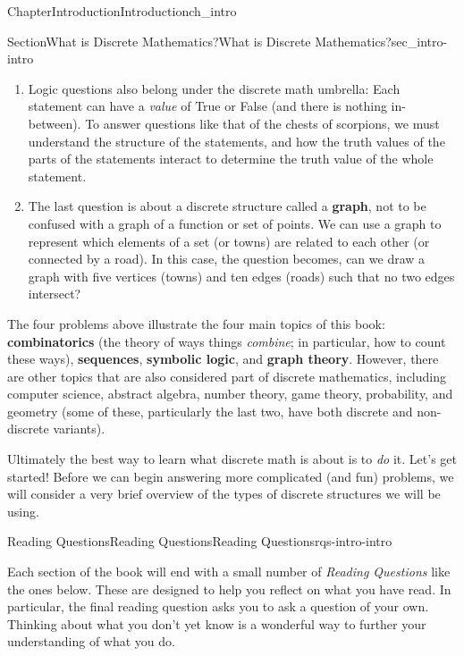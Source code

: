 \documentclass[twoside,11pt,]{book}
\newcommand{\terminology}[1]{\textbf{#1}}
\numberwithin{equation}{chapter}
\begin{document}
\begin{chapterptx}{Chapter}{Introduction}{}{Introduction}{}{}{ch_intro}
\begin{sectionptx}{Section}{What is Discrete Mathematics?}{}{What is Discrete Mathematics?}{}{}{sec_intro-intro}
\begin{enumerate}
The solution to the problem will then be the value of the 26th term in the sequence.  To help us find this, we could consider the rate of growth of the sequences, as well as how these two sequences relate to each other.%
\item{}Logic questions also belong under the discrete math umbrella: Each statement can have a \emph{value} of True or False (and there is nothing in-between).  To answer questions like that of the chests of scorpions, we must understand the structure of the statements, and how the truth values of the parts of the statements interact to determine the truth value of the whole statement.%
\item{}The last question is about a discrete structure called a \terminology{graph}, not to be confused with a graph of a function or set of points.  We can use a graph to represent which elements of a set (or towns) are related to each other (or connected by a road).  In this case, the question becomes, can we draw a graph with five vertices (towns) and ten edges (roads) such that no two edges intersect?%
\end{enumerate}
%
\par
The four problems above illustrate the four main topics of this book: \terminology{combinatorics} (the theory of ways things \emph{combine}; in particular, how to count these ways), \terminology{sequences}, \terminology{symbolic logic}, and \terminology{graph theory}. However, there are other topics that are also considered part of discrete mathematics, including computer science, abstract algebra, number theory, game theory, probability, and geometry (some of these, particularly the last two, have both discrete and non-discrete variants).%
\par
Ultimately the best way to learn what discrete math is about is to \emph{do} it. Let's get started! Before we can begin answering more complicated (and fun) problems, we will consider a very brief overview of the types of discrete structures we will be using.%
%
%
\typeout{************************************************}
\typeout{************************************************}
%
\begin{reading-questions-subsection-numberless}{Reading Questions}{Reading Questions}{}{Reading Questions}{}{}{rqs-intro-intro}
\begin{introduction}{}%
Each section of the book will end with a small number of \emph{Reading Questions} like the ones below. These are designed to help you reflect on what you have read. In particular, the final reading question asks you to ask a question of your own. Thinking about what you don't yet know is a wonderful way to further your understanding of what you do.%

\end{introduction}
\end{reading-questions-subsection-numberless}
\end{sectionptx}
\end{chapterptx}
\end{document}
